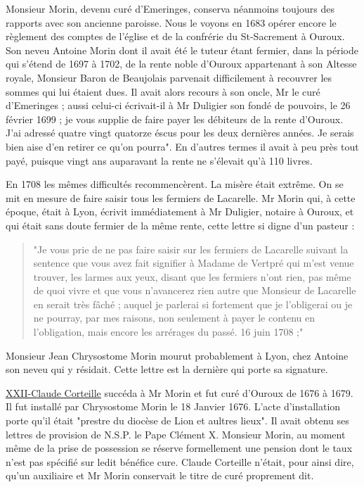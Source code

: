 Monsieur Morin, devenu curé d'Emeringes, conserva néanmoins toujours des rapports avec son ancienne paroisse. Nous le voyons en 1683 opérer encore le règlement des comptes de l'église et de la confrérie du St-Sacrement à Ouroux. Son neveu Antoine Morin dont il avait été le tuteur étant fermier, dans la période qui s'étend de 1697 à 1702, de la rente noble d'Ouroux appartenant à son Altesse royale, Monsieur Baron de Beaujolais parvenait difficilement à recouvrer les sommes qui lui étaient dues. Il avait alors recours à son oncle, Mr le curé d'Emeringes ; aussi celui-ci écrivait-il à Mr Duligier son fondé de pouvoirs, le 26 février 1699 ; je vous supplie de faire payer les débiteurs de la rente d'Ouroux. J'ai adressé quatre vingt quatorze éscus pour les deux dernières années. Je serais bien aise d'en retirer ce qu'on pourra". En d'autres termes il avait à
peu près tout payé, puisque vingt ans auparavant la rente ne s'élevait qu'à 110 livres.

En 1708 les mêmes difficultés recommencèrent. La misère était extrême. On se mit en mesure de faire saisir tous les fermiers de Lacarelle. Mr Morin qui, à cette époque, était à Lyon, écrivit immédiatement à Mr Duligier, notaire à Ouroux, et qui était sans doute fermier de la même rente, cette lettre si digne d'un pasteur :

\begin{quote}
"Je vous prie de ne pas faire saisir sur les fermiers de Lacarelle suivant la sentence que vous avez fait signifier à Madame de Vertpré qui m'est venue trouver, les larmes aux yeux, disant que les fermiers n'ont rien, pas même de quoi vivre et que vous n'avancerez rien autre que Monsieur de Lacarelle en serait très fâché ; auquel je parlerai si fortement que je l'obligerai ou je ne pourray, par mes raisons, non seulement à payer le contenu en l'obligation, mais encore les arrérages du passé. 16 juin 1708 ;"
\end{quote}

Monsieur Jean Chrysostome Morin mourut probablement à Lyon, chez Antoine son neveu qui y résidait. Cette lettre est la dernière qui porte sa signature.

\underline{XXII-Claude Corteille} succéda à Mr Morin et fut curé d'Ouroux de 1676 à 1679. Il fut installé par Chrysostome Morin le 18 Janvier 1676. L'acte d'installation porte qu'il était "prestre du diocèse de Lion et aultres lieux". Il avait obtenu ses lettres de provision de N.S.P. le Pape Clément X. Monsieur Morin, au moment même de la prise de possession se réserve formellement une pension dont le taux n'est pas spécifié sur ledit bénéfice cure. Claude Corteille n'était, pour ainsi dire, qu'un auxiliaire et Mr Morin conservait le titre de curé proprement dit.

